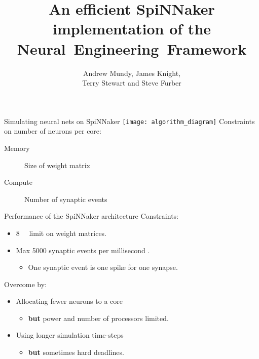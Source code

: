 \documentclass[handout,t]{beamer}
\title{An efficient SpiNNaker implementation of the Neural~Engineering~Framework}
\author{Andrew Mundy, James Knight,\\Terry Stewart and Steve Furber}
\begin{document}
  \maketitle

  \begin{frame}{Simulating neural nets on SpiNNaker}
    \vfill
    \hspace*{-.15\textwidth}\texttt{[image: algorithm\_diagram]}
    \vfill
    \pause
    Constraints on number of neurons per core:
    \begin{description}
      \item[Memory] Size of weight matrix
      \item[Compute] Number of synaptic events
    \end{description}
  \end{frame}

  \begin{frame}{Performance of the SpiNNaker architecture}
    Constraints:
    \begin{itemize}
      \item \SI{8}{\mebi\byte} limit on weight matrices.
      \item Max \num{5000} synaptic events per millisecond \parencite{Sharp2013}.
      \begin{itemize}
        \item One synaptic event is one spike for one synapse.
      \end{itemize}
    \end{itemize}

    \pause
    Overcome by:
    \begin{itemize}[<+->]
      \item Allocating fewer neurons to a core
        \begin{itemize}
          \item \textbf{but} power and number of processors limited.
        \end{itemize}
      \item Using longer simulation time-steps
        \begin{itemize}
          \item \textbf{but} sometimes hard deadlines.
        \end{itemize}
    \end{itemize}
  \end{frame}
\end{document}

